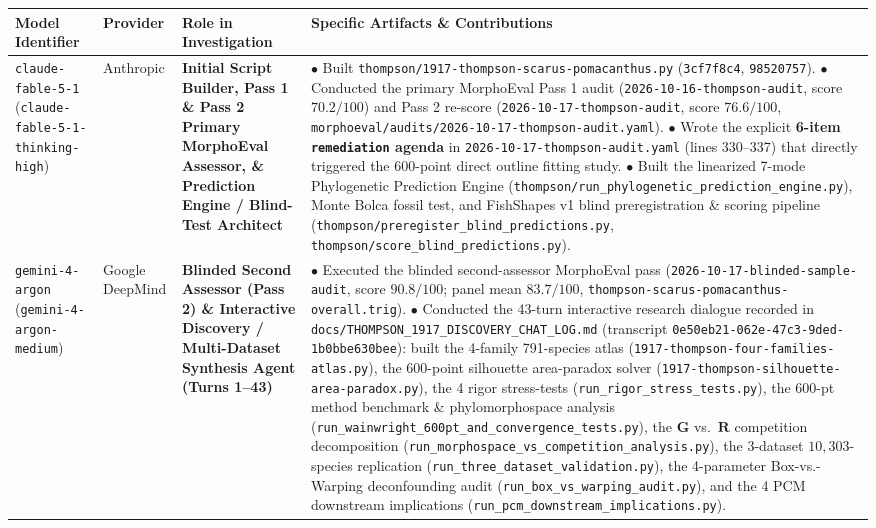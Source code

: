 \documentclass[10.5pt,a4paper]{article}
\newcommand{\code}[1]{{\footnotesize\nolinkurl{#1}}}
\begin{document}
\vspace{0.3em}
{\small
\renewcommand{\arraystretch}{1.26}
\begin{tabularx}{\textwidth}{L{1.25in} L{0.82in} L{1.35in} Y}
\toprule
\textbf{Model Identifier} & \textbf{Provider} & \textbf{Role in Investigation} & \textbf{Specific Artifacts \& Contributions} \\
\midrule
\code{claude-fable-5-1} (\code{claude-fable-5-1-thinking-high}) &
Anthropic &
\textbf{Initial Script Builder, Pass 1 \& Pass 2 Primary MorphoEval Assessor, \& Prediction Engine / Blind-Test Architect} &
$\bullet$ Built \code{thompson/1917-thompson-scarus-pomacanthus.py} (\texttt{3cf7f8c4}, \texttt{98520757}).\newline
$\bullet$ Conducted the primary MorphoEval Pass 1 audit (\code{2026-10-16-thompson-audit}, score $70.2/100$) and Pass 2 re-score (\code{2026-10-17-thompson-audit}, score $76.6/100$, \code{morphoeval/audits/2026-10-17-thompson-audit.yaml}).\newline
$\bullet$ Wrote the explicit \textbf{6-item \texttt{remediation} agenda} in \code{2026-10-17-thompson-audit.yaml} (lines 330--337) that directly triggered the 600-point direct outline fitting study.\newline
$\bullet$ Built the linearized 7-mode Phylogenetic Prediction Engine (\code{thompson/run_phylogenetic_prediction_engine.py}), Monte Bolca fossil test, and FishShapes v1 blind preregistration \& scoring pipeline (\code{thompson/preregister_blind_predictions.py}, \code{thompson/score_blind_predictions.py}). \\
\midrule
\code{gemini-4-argon} (\code{gemini-4-argon-medium}) &
Google DeepMind &
\textbf{Blinded Second Assessor (Pass 2) \& Interactive Discovery / Multi-Dataset Synthesis Agent (Turns 1--43)} &
$\bullet$ Executed the blinded second-assessor MorphoEval pass (\code{2026-10-17-blinded-sample-audit}, score $90.8/100$; panel mean $83.7/100$, \code{thompson-scarus-pomacanthus-overall.trig}).\newline
$\bullet$ Conducted the 43-turn interactive research dialogue recorded in \code{docs/THOMPSON_1917_DISCOVERY_CHAT_LOG.md} (transcript \code{0e50eb21-062e-47c3-9ded-1b0bbe630bee}): built the 4-family 791-species atlas (\code{1917-thompson-four-families-atlas.py}), the 600-point silhouette area-paradox solver (\code{1917-thompson-silhouette-area-paradox.py}), the 4 rigor stress-tests (\code{run_rigor_stress_tests.py}), the 600-pt method benchmark \& phylomorphospace analysis (\code{run_wainwright_600pt_and_convergence_tests.py}), the $\bm{G}$ vs.\ $\bm{R}$ competition decomposition (\code{run_morphospace_vs_competition_analysis.py}), the 3-dataset $10{,}303$-species replication (\code{run_three_dataset_validation.py}), the 4-parameter Box-vs.-Warping deconfounding audit (\code{run_box_vs_warping_audit.py}), and the 4 PCM downstream implications (\code{run_pcm_downstream_implications.py}). \\

\end{tabularx}}
\end{document}
